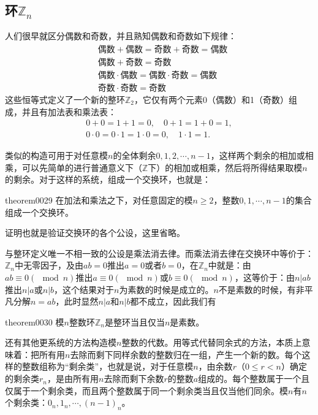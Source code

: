 \subsection{环$\mathbb{Z}_n$}\label{subsection0010110}
人们很早就区分偶数和奇数，并且熟知偶数和奇数如下规律：
\[
\begin{aligned}
&\text{偶数}+\text{偶数} = \text{奇数} + \text{奇数} = \text{偶数}\\
&\text{偶数}+\text{奇数} = \text{奇数}\\
&\text{偶数}\cdot\text{偶数} = \text{偶数}\cdot\text{奇数} = \text{偶数}\\
&\text{奇数} \cdot \text{奇数} = \text{奇数}
\end{aligned}
\]
这些恒等式定义了一个新的整环$\mathbb{Z}_2$，它仅有两个元素0（偶数）和1（奇数）组成，并且有加法表和乘法表：
\begin{gather*}
0+0=1+1=0, \quad 0+1=1+0=1,\\
0 \cdot 0=0 \cdot 1= 1 \cdot 0 =0,\quad 1 \cdot 1 = 1.
\end{gather*}

类似的构造可用于对任意模$n$的全体剩余$0,1,2,\cdots,n-1$，这样两个剩余的相加或相乘，可以先简单的进行普通意义下（$\mathbb{Z}$下）的相加或相乘，然后将所得结果取模$n$的剩余。对于这样的系统，组成一个交换环，也就是：
\begin{theorem}{}{theorem0029}
在加法和乘法之下，对任意固定的模$n \ge 2$，整数$0, 1, \cdots, n-1$的集合组成一个交换环。
\end{theorem}

证明也就是验证交换环的各个公设，这里省略。

与整环定义唯一不相一致的公设是乘法消去律。而乘法消去律在交换环中等价于：$\mathbb{Z}_n$中无零因子，及由$ab=0$推出$a=0$或者$b=0$，在$\mathbb{Z}_n$中就是：由$ab \equiv 0(\mod{n})$推出$a \equiv 0(\mod{n})$或$b \equiv 0(\mod{n})$，这等价于：由$n|ab$推出$n|a$或$n|b$，这个结果对于$n$为素数的时候是成立的。$n$不是素数的时候，有非平凡分解$n=ab$，此时显然$n|a$和$n|b$都不成立，因此我们有
\begin{theorem}{}{theorem0030}
模$n$整数环$\mathbb{Z}_n$是整环当且仅当$n$是素数。
\end{theorem}

还有其他更系统的方法构造模$n$整数的代数。用等式代替同余式的方法，本质上意味着：把所有用$n$去除而剩下同样余数的整数归在一组，产生一个新的数。每个这样的整数组称为“剩余类”，也就是说，对于任意模$n$，由余数$r$（$0 \le r < n$）确定的剩余类$r_n$，是由所有用$n$去除而剩下余数$r$的整数$a$组成的。每个整数属于一个且仅属于一个剩余类，而且两个整数属于同一个剩余类当且仅当他们同余。模$n$有$n$个剩余类：$0_n,1_n,\cdots,(n-1)_n$。

